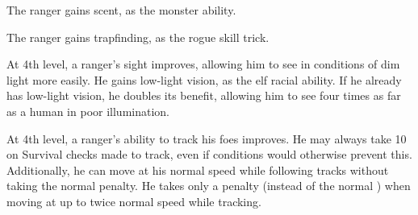  The ranger gains scent, as the monster ability.

 The ranger gains trapfinding, as the rogue skill trick.

\begin{comment}
\cf{Rgr}{Animal Companion (Ex)}:  At 4th level, a ranger gains an animal
companion selected from the following list: badger, camel, dire rat,
dog, riding dog, eagle, hawk, horse (light or heavy), owl, pony, snake
(Small or Medium viper), or wolf. If the campaign takes place
wholly or partly in an aquatic environment, the following creatures may be added
to the ranger's list of options: crocodile,
porpoise, Medium shark, and squid. This animal is a loyal
companion that accompanies the ranger on his adventures as
appropriate for its kind.

\par This ability functions like the druid ability of the same name (see \pref{Drd:Animal Companion (Ex)}), except that the ranger's effective druid level is equal to his ranger level \sub 3.
\par For example, the animal companion of an 8th-level
ranger would be the equivalent of a 5th-level druid's animal
companion.
\end{comment}

 At 4th level, a ranger's sight improves, allowing him to see in conditions of dim light more easily. He gains low-light vision, as the elf racial ability. If he already has low-light vision, he doubles its benefit, allowing him to see four times as far as a human in poor illumination.

 At 4th level, a ranger's ability to track his foes improves. He may always take 10 on Survival checks made to track, even if conditions would otherwise prevent this. Additionally, he can move at his normal speed while following tracks without taking the normal  penalty. He takes only a  penalty (instead of the normal ) when moving at up to twice normal speed while tracking.

